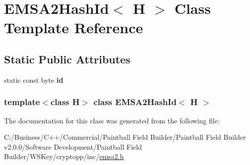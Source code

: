 \hypertarget{class_e_m_s_a2_hash_id}{
\section{EMSA2HashId$<$ H $>$ Class Template Reference}
\label{class_e_m_s_a2_hash_id}
}
\subsection*{Static Public Attributes}
\begin{DoxyCompactItemize}
\item 
\hypertarget{class_e_m_s_a2_hash_id_a19f5455add015fab68606baba8fd3550}{
static const byte {\bfseries id}}
\label{class_e_m_s_a2_hash_id_a19f5455add015fab68606baba8fd3550}

\end{DoxyCompactItemize}
\subsubsection*{template$<$class H$>$ class EMSA2HashId$<$ H $>$}



The documentation for this class was generated from the following file:\begin{DoxyCompactItemize}
\item 
C:/Business/C++/Commercial/Paintball Field Builder/Paintball Field Builder v2.0.0/Software Development/Paintball Field Builder/WSKey/cryptopp/inc/\hyperlink{emsa2_8h}{emsa2.h}\end{DoxyCompactItemize}
